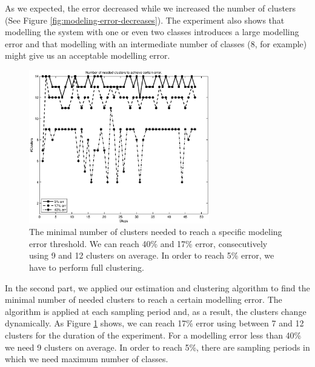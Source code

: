  As we expected, the error decreased while we increased the number of clusters (See Figure \ref{fig:modeling-error-decreases}). The experiment also shows that modelling the system with one or even two classes introduces a large modelling error and that modelling with an intermediate number of classes (8, for example) might give us an acceptable modelling error. 
\begin{figure}[htbp]
	\centering
	\includegraphics[width=0.7\textwidth]{image/cluster_num_by_error.eps} 
	\caption[ The minimum number of clusters, dynamically adjusted, to reach a certain modeling error.]{The minimal number of clusters needed to reach a specific modeling error threshold.  We can reach 40\% and 17\% error, consecutively using 9 and 12 clusters on average. In order to reach 5\% error, we have to perform full clustering.}
	\label{fig:minimal-number-needed-clusters}      
\end{figure}

In the second part, we applied our estimation and clustering algorithm to find the minimal number of needed clusters to reach a certain modelling error. The algorithm is applied at each sampling period and, as a result, the clusters change dynamically. As Figure \ref{fig:minimal-number-needed-clusters} shows, we can reach 17\% error using between 7 and 12 clusters for the duration of the experiment. For a modelling error less than 40\% we need 9 clusters on average. In order to reach 5\%, there are sampling periods in which we need maximum number of classes.

